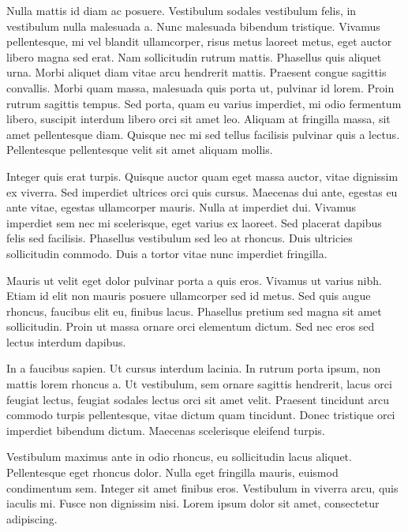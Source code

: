 Nulla mattis id diam ac posuere. Vestibulum sodales vestibulum felis, in vestibulum nulla malesuada a. Nunc malesuada bibendum tristique. Vivamus pellentesque, mi vel blandit ullamcorper, risus metus laoreet metus, eget auctor libero magna sed erat. Nam sollicitudin rutrum mattis. Phasellus quis aliquet urna. Morbi aliquet diam vitae arcu hendrerit mattis. Praesent congue sagittis convallis. Morbi quam massa, malesuada quis porta ut, pulvinar id lorem. Proin rutrum sagittis tempus. Sed porta, quam eu varius imperdiet, mi odio fermentum libero, suscipit interdum libero orci sit amet leo. Aliquam at fringilla massa, sit amet pellentesque diam. Quisque nec mi sed tellus facilisis pulvinar quis a lectus. Pellentesque pellentesque velit sit amet aliquam mollis.

Integer quis erat turpis. Quisque auctor quam eget massa auctor, vitae dignissim ex viverra. Sed imperdiet ultrices orci quis cursus. Maecenas dui ante, egestas eu ante vitae, egestas ullamcorper mauris. Nulla at imperdiet dui. Vivamus imperdiet sem nec mi scelerisque, eget varius ex laoreet. Sed placerat dapibus felis sed facilisis. Phasellus vestibulum sed leo at rhoncus. Duis ultricies sollicitudin commodo. Duis a tortor vitae nunc imperdiet fringilla.

Mauris ut velit eget dolor pulvinar porta a quis eros. Vivamus ut varius nibh. Etiam id elit non mauris posuere ullamcorper sed id metus. Sed quis augue rhoncus, faucibus elit eu, finibus lacus. Phasellus pretium sed magna sit amet sollicitudin. Proin ut massa ornare orci elementum dictum. Sed nec eros sed lectus interdum dapibus.

In a faucibus sapien. Ut cursus interdum lacinia. In rutrum porta ipsum, non mattis lorem rhoncus a. Ut vestibulum, sem ornare sagittis hendrerit, lacus orci feugiat lectus, feugiat sodales lectus orci sit amet velit. Praesent tincidunt arcu commodo turpis pellentesque, vitae dictum quam tincidunt. Donec tristique orci imperdiet bibendum dictum. Maecenas scelerisque eleifend turpis.

Vestibulum maximus ante in odio rhoncus, eu sollicitudin lacus aliquet. Pellentesque eget rhoncus dolor. Nulla eget fringilla mauris, euismod condimentum sem. Integer sit amet finibus eros. Vestibulum in viverra arcu, quis iaculis mi. Fusce non dignissim nisi. Lorem ipsum dolor sit amet, consectetur adipiscing. 

